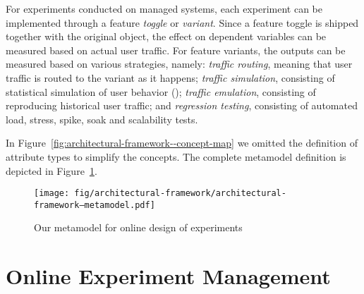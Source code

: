 For experiments conducted on managed systems, each experiment can be implemented through a feature \emph{toggle} or \emph{variant}. Since a feature toggle is shipped together with the original object, the effect on dependent variables can be measured based on actual user traffic. For feature variants, the outputs can be measured based on various strategies, namely: \emph{traffic routing}, meaning that user traffic is routed to the variant as it happens;  \emph{traffic simulation}, consisting of statistical simulation of user behavior (); \emph{traffic emulation}, consisting of reproducing historical user traffic; and \emph{regression testing}, consisting of automated load, stress, spike, soak and scalability tests.

In Figure~\ref{fig:architectural-framework--concept-map} we omitted the definition of attribute types to simplify the concepts. The complete metamodel definition is depicted in Figure~\ref{fig:architectural-framework--metamodel}.

\begin{figure}[h]
	\centering
	\texttt{[image: fig/architectural-framework/architectural-framework--metamodel.pdf]}
	\caption{Our metamodel for online design of experiments}
	\label{fig:architectural-framework--metamodel}
\end{figure}

\section{Online Experiment Management}
\label{sect:architectural-framework--experiment-management}


